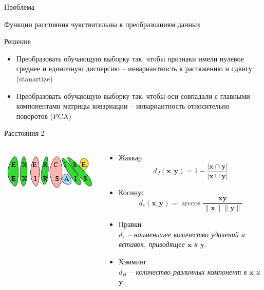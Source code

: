 \documentclass[10pt,a4paper]{beamer}
\begin{document}

\begin{frame}{Проблема}

Функции расстояния чувствительны к преобразоаниям данных

\vspace{1em}
Решение
\begin{itemize}
\item Преобразовать обучающую выборку так, чтобы  признаки имели нулевое среднее и единичную дисперсию -- инвариантность к растяжению и сдвигу (stanartize)
\item Преобразовать обучающую выборку так, чтобы оси совпадали с главными компонентами матрицы ковариации -- инвариантность относительно поворотов (PCA)
\end{itemize}


\end{frame}


\begin{frame}{Расстояния 2}

\begin{columns}[T]

    \begin{column}{.4\textwidth}
    \vspace{5em}
	\begin{center}
   		\includegraphics[scale=0.5]{images/edit.png}
    \end{center}
    \end{column}
       
    \begin{column}{.6\textwidth}
    \begin{itemize}
		\item Жаккар
		\[
		d_J(\mathbf{x}, \mathbf{y}) = 1 - \frac{|\mathbf{x} \cap \mathbf{y}|}{|\mathbf{x} \cup \mathbf{y}|}
		\]
		\item Косинус
		\[
		d_c(\mathbf{x}, \mathbf{y}) = \arccos \frac{\mathbf{x} \mathbf{y}}{\|\mathbf{x}\| \|\mathbf{y}\|}
		\]
		\item Правки \\
		{\it $d_e$ -- наименьшее количество удалений и вставок, приводящее $\mathbf{x}$ к $\mathbf{y}$.}
		\item Хэмминг \\
		{\it $d_H$ -- количество различных компонент в $\mathbf{x}$ и $\mathbf{y}$.}
	\end{itemize}
    
    \end{column}
  \end{columns}

\end{frame}
\end{document}
